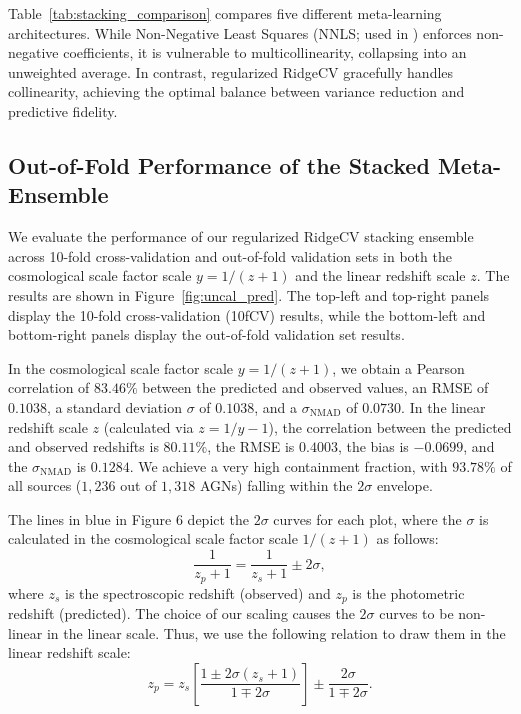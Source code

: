 \documentclass[twocolumn,linenumbers,floatfix]{aastex701}
\begin{document}
Table~\ref{tab:stacking_comparison} compares five different meta-learning architectures. While Non-Negative Least Squares (NNLS; used in \citealt{Narendra2022}) enforces non-negative coefficients, it is vulnerable to multicollinearity, collapsing into an unweighted average. In contrast, regularized RidgeCV gracefully handles collinearity, achieving the optimal balance between variance reduction and predictive fidelity.

\subsection{Out-of-Fold Performance of the Stacked Meta-Ensemble}

\label{sec:stacked_perf}
We evaluate the performance of our regularized RidgeCV stacking ensemble across 10-fold cross-validation and out-of-fold validation sets in both the cosmological scale factor scale $y = 1/(z+1)$ and the linear redshift scale $z$. The results are shown in Figure~\ref{fig:uncal_pred}. The top-left and top-right panels display the 10-fold cross-validation (10fCV) results, while the bottom-left and bottom-right panels display the out-of-fold validation set results.

In the cosmological scale factor scale $y = 1/(z+1)$, we obtain a Pearson correlation of $83.46\%$ between the predicted and observed values, an RMSE of $0.1038$, a standard deviation $\sigma$ of $0.1038$, and a $\sigma_{\text{NMAD}}$ of $0.0730$. In the linear redshift scale $z$ (calculated via $z = 1/y - 1$), the correlation between the predicted and observed redshifts is $80.11\%$, the RMSE is $0.4003$, the bias is $-0.0699$, and the $\sigma_{\text{NMAD}}$ is $0.1284$. We achieve a very high containment fraction, with $93.78\%$ of all sources ($1,236$ out of $1,318$ AGNs) falling within the $2\sigma$ envelope.

The lines in blue in Figure 6 depict the $2\sigma$ curves for each plot, where the $\sigma$ is calculated in the cosmological scale factor scale $1/(z+1)$ as follows:
\begin{equation}
\frac{1}{z_p + 1} = \frac{1}{z_s + 1} \pm 2\sigma,
\end{equation}
where $z_s$ is the spectroscopic redshift (observed) and $z_p$ is the photometric redshift (predicted). The choice of our scaling causes the $2\sigma$ curves to be non-linear in the linear scale. Thus, we use the following relation to draw them in the linear redshift scale:
\begin{equation}
z_p = z_s \left[ \frac{1 \pm 2\sigma(z_s + 1)}{1 \mp 2\sigma} \right] \pm \frac{2\sigma}{1 \mp 2\sigma}.
\end{equation}
\end{document}
